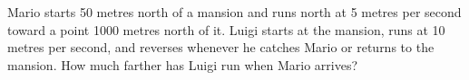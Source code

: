 Mario starts 50 metres north of a mansion and runs north at 5 metres per second toward a point 1000 metres north of it. Luigi starts at the mansion, runs at 10 metres per second, and reverses whenever he catches Mario or returns to the mansion. How much farther has Luigi run when Mario arrives?
